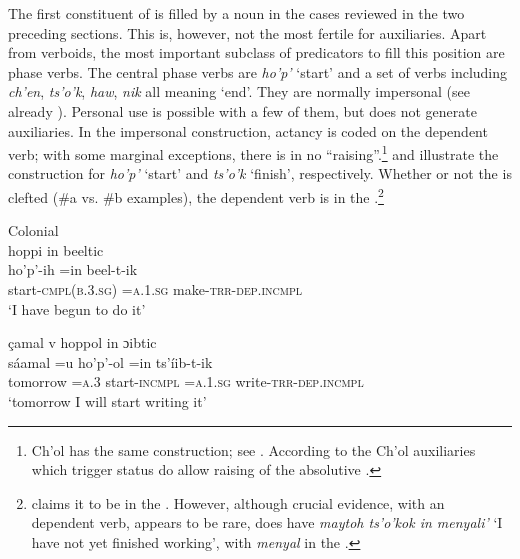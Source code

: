 \documentclass[output=paper]{langsci/langscibook}
\begin{document}
The first constituent of  is filled by a noun in the cases reviewed in the two preceding sections. This is, however, not the most fertile  for auxiliaries. Apart from  verboids, the most important subclass of  predicators to fill this position are phase verbs. The central  phase verbs are \textit{ho'p'} ‘start’ and a set of verbs including \textit{ch'en}, \textit{ts'o'k}, \textit{haw}, \textit{nik} all meaning ‘end’. They are normally impersonal (see already \citealt[34f]{Coronel1620}). Personal use is possible with a few of them, but does not generate auxiliaries. In the impersonal construction, actancy is coded on the dependent verb; with some marginal exceptions, there is in  no “raising”.\footnote{Ch'ol has the same construction; see \citet[239]{Aulie1998}. According to \citet[§5.2]{Coon2010} the Ch’ol auxiliaries which trigger  status do allow raising of the absolutive .}  and  illustrate the construction for \textit{ho'p'} ‘start’ and \textit{ts'o'k} ‘finish’, respectively. Whether or not the  is clefted (\#a vs. \#b examples), the dependent verb is in the  .\footnote{\citet[89]{Smailus1989} claims it to be in the . However, although crucial evidence, with an  dependent verb, appears to be rare, \citealt[35]{Coronel1620} does have \textit{maytoh ts'o'kok in menyali'} ‘I have not yet finished working’, with \textit{menyal} in the .}



\ea\label{ex:lehmann:47}
Colonial  \\
\ea 
hoppi      in      beeltic\\
\gll ho'p'-ih          =in      beel-t-ik\\
  start-\textsc{cmpl(b.3.sg)}   =\textsc{a.1.sg}    make-\textsc{trr-dep.incmpl}\\
\glt ‘I have begun to do it’ \citep[53]{Coronel1620}

\ex 
çamal    v      hoppol      in        ɔibtic\\
\gll   sáamal    =u    ho'p'-ol    =in      ts'íib-t-ik\\
tomorrow  =\textsc{a.3}    start-\textsc{incmpl} \textsc{=a.1.sg}   write-\textsc{trr-dep.incmpl}\\
\glt ‘tomorrow I will start writing it’ \citep[35]{Coronel1620}
\z
\z
\end{document}
